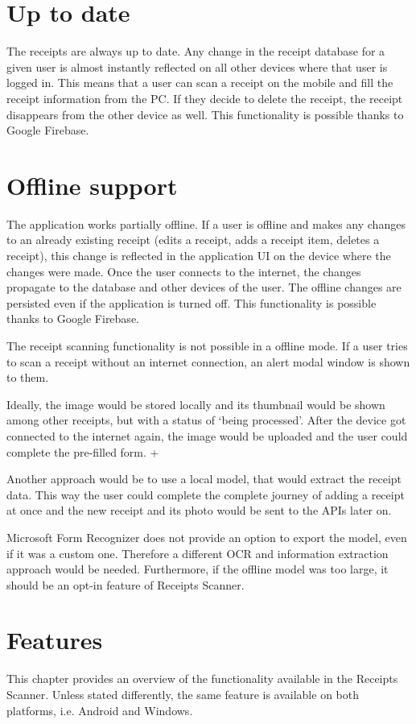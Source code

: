 \documentclass[
  digital, %
  table,   %
  oneside, %
  lof,     %
  lot,     %
]{fithesis3}
\begin{document}
\section{Up to date}
The receipts are always up to date. Any change in the receipt database for a given user is almost instantly reflected on all other devices where that user is logged in. This means that a user can scan a receipt on the mobile and fill the receipt information from the PC. If they decide to delete the receipt, the receipt disappears from the other device as well.
This functionality is possible thanks to Google Firebase.

\section{Offline support}
The application works partially offline. If a user is offline and makes any changes to an already existing receipt (edits a receipt, adds a receipt item, deletes a receipt), this change is reflected in the application UI on the device where the changes were made. Once the user connects to the internet, the changes propagate to the database and other devices of the user. The offline changes are persisted even if the application is turned off. This functionality is possible thanks to Google Firebase.

The receipt scanning functionality is not possible in a offline mode. If a user tries to scan a receipt without an internet connection, an alert modal window is shown to them.

Ideally, the image would be stored locally and its thumbnail would be shown among other receipts, but with a status of ‘being processed’. After the device got connected to the internet again, the image would be uploaded and the user could complete the pre-filled form. +

Another approach would be to use a local model, that would extract the receipt data. This way the user could complete the complete journey of adding a receipt at once and the new receipt and its photo would be sent to the APIs later on. 

Microsoft Form Recognizer does not provide an option to export the model, even if it was a custom one. Therefore a different OCR and information extraction approach would be needed. Furthermore, if the offline model was too large, it should be an opt-in feature of Receipts Scanner.

\section{Features}
This chapter provides an overview of the functionality available in the Receipts Scanner. Unless stated differently, the same feature is available on both platforms, i.e. Android and Windows.
\end{document}
